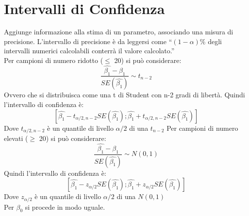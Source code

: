 \section{Intervalli di Confidenza}
Aggiunge informazione alla stima di un parametro, associando una misura di 
precisione. L'intervallo di precisione è da leggersi come  ``$(1-\alpha) \% $ 
degli intervalli numerici calcolabili conterrà il valore calcolato.''\\
Per campioni di numero ridotto ($\le$ 20) si può considerare:
\[ \frac{\hat{\beta_1} - \beta_1}{SE(\hat{\beta_1})} \sim t_{n-2} \]
Ovvero che si distribuisca come una t di Student con n-2 gradi di libertà.
Quindi l'intervallo di confidenza è:
\[ [ \hat{\beta_1} - t_{\alpha/2, n-2} SE(\hat{\beta_1}) ; \hat{\beta_1} + 
t_{\alpha/2, n-2} SE(\hat{\beta_1}) ] \]
Dove $t_{\alpha/2, n-2}$ è un quantile di livello $\alpha/2$ di una $t_{n-2}$
Per campioni di numero elevati ($\ge$ 20) si pu\`o considerare:
\[ \frac{\hat{\beta_1} - \beta_1}{SE(\hat{\beta_1})} \sim N(0,1) \]
Quindi l'intervallo di confidenza è:
\[ [ \hat{\beta_1} - z_{\alpha/2} SE(\hat{\beta_1}) ; \hat{\beta_1} +  
z_{\alpha/2} SE(\hat{\beta_1}) ] \]
Dove $z_{\alpha/2}$ è un quantile di livello $\alpha/2$ di una $N(0,1)$
\\ Per $\beta_0$ si procede in modo uguale.
